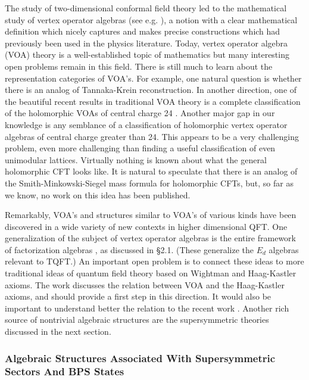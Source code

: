 \documentclass[12pt]{article}
\begin{document}
The study of two-dimensional conformal field theory
led to the   mathematical study of vertex operator algebras (see e.g. \cite{Goddard:1986bp,Borcherds,FLM}),
a notion with a clear mathematical definition
which nicely captures and makes precise constructions which had previously been used in the physics literature.  Today, vertex operator algebra (VOA) theory is a well-established topic of mathematics
but many interesting open problems remain in this field. There is still much to learn about the representation categories of VOA's. For example, one natural question is whether there is an analog of Tannaka-Krein reconstruction.  In another direction, one of the beautiful recent results in traditional VOA theory is a complete classification
of the holomorphic VOAs of central charge 24
\cite{Moller:2021clp,Schellekens:1992db,Schellekens:1993va,vanEkeren:2017scl}. Another major gap in
our knowledge is any semblance of a classification of holomorphic
vertex operator algebras of central charge greater than 24. This
appears to be a very challenging problem, even more challenging than finding
a useful classification of even unimodular lattices. Virtually nothing is known
about what the general holomorphic CFT looks like. It is natural to speculate that there is an analog of the 
Smith-Minkowski-Siegel mass formula for holomorphic CFTs, but, so far as we know,  no work on this idea has been published. 

Remarkably, VOA's and structures similar to VOA's of various kinds have been discovered in a
wide variety of new contexts in higher dimensional QFT.
One generalization of the subject of vertex operator algebras is
the entire  framework of factorization algebras \cite{Costello:2016vjw}, as discussed in \S2.1.
(These generalize the $E_d$ algebras relevant to TQFT.) 
An important open problem is to connect these ideas to more traditional
ideas of quantum field theory based on Wightman and Haag-Kastler
axioms. The work \cite{Carpi:2015fga} discusses the relation between VOA and the Haag-Kastler axioms, and should provide a first step in this direction. 
It would also be important to understand better the relation
to the recent work \cite{Kontsevich:2021dmb}. Another rich source of nontrivial
algebraic structures are the supersymmetric theories discussed in the next section.






\subsubsection{Algebraic Structures Associated With Supersymmetric Sectors And BPS States}
\end{document}
